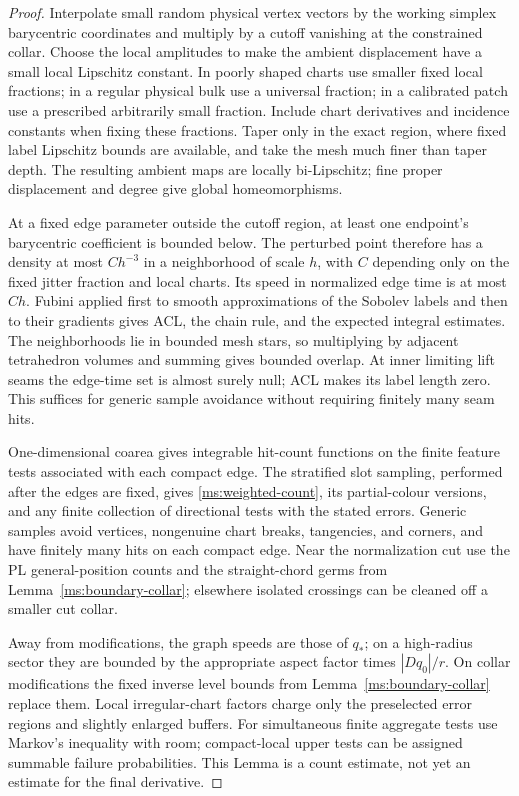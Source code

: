 \begin{proof}
Interpolate small random physical vertex vectors by the working
simplex barycentric coordinates and multiply by a cutoff vanishing
at the constrained collar.  Choose the local amplitudes to make the
ambient displacement have a small local Lipschitz constant.  In
poorly shaped charts use smaller fixed local fractions; in a regular
physical bulk use a universal fraction; in a calibrated patch use a
prescribed arbitrarily small fraction.  Include chart derivatives
and incidence constants when fixing these fractions.  Taper only in
the exact region, where fixed label Lipschitz bounds are available,
and take the mesh much finer than taper depth.  The resulting
ambient maps are locally bi-Lipschitz; fine proper displacement and
degree give global homeomorphisms.

At a fixed edge parameter outside the cutoff region, at least one
endpoint's barycentric coefficient is bounded below.  The perturbed
point therefore has a density at most $C h^{-3}$ in a neighborhood
of scale $h$, with $C$ depending only on the fixed jitter fraction
and local charts.  Its speed in normalized edge time is at most
$C h$.  Fubini applied first to smooth approximations of the
Sobolev labels and then to their gradients gives ACL, the chain
rule, and the expected integral estimates.  The neighborhoods lie
in bounded mesh stars, so multiplying by adjacent tetrahedron
volumes and summing gives bounded overlap.  At inner limiting lift
seams the edge-time set is almost surely null; ACL makes its label
length zero.  This suffices for generic sample avoidance without
requiring finitely many seam hits.

One-dimensional coarea gives integrable hit-count functions on the
finite feature tests associated with each compact edge.  The
stratified slot sampling, performed after the edges are fixed,
gives \eqref{ms:weighted-count}, its partial-colour versions, and any
finite collection of directional tests with the stated errors.
Generic samples avoid vertices, nongenuine chart breaks, tangencies,
and corners, and have finitely many hits on each compact edge.
Near the normalization cut use the PL general-position counts and
the straight-chord germs from Lemma~\ref{ms:boundary-collar}; elsewhere
isolated crossings can be cleaned off a smaller cut collar.

Away from modifications, the graph speeds are those of $q_*$; on a
high-radius sector they are bounded by the appropriate aspect
factor times $|Dq_0|/r$.  On collar modifications the fixed inverse
level bounds from Lemma~\ref{ms:boundary-collar} replace them.  Local
irregular-chart factors charge only the preselected error regions
and slightly enlarged buffers.  For simultaneous finite aggregate
tests use Markov's inequality with room; compact-local upper tests
can be assigned summable failure probabilities.  This Lemma is a
count estimate, not yet an estimate for the final derivative.
\end{proof}

